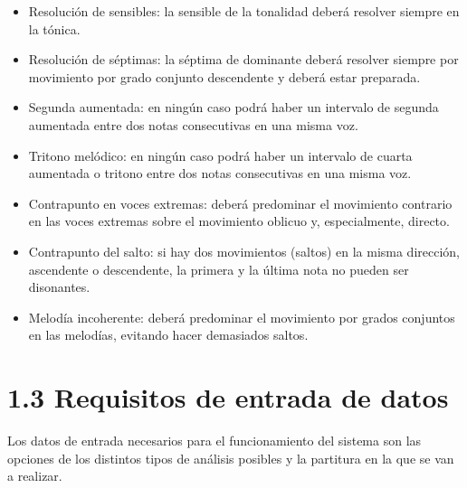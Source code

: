 \begin{itemize}

	\item Resolución de sensibles: la sensible de la tonalidad deberá resolver siempre en la tónica.

	\item Resolución de séptimas: la séptima de dominante deberá resolver siempre por movimiento por grado conjunto descendente y deberá estar preparada.

	\item Segunda aumentada: en ningún caso podrá haber un intervalo de segunda aumentada entre dos notas consecutivas en una misma voz.

	\item Tritono melódico: en ningún caso podrá haber un intervalo de cuarta aumentada o tritono entre dos notas consecutivas en una misma voz.

	\item Contrapunto en voces extremas: deberá predominar el movimiento contrario en las voces extremas sobre el movimiento oblicuo y, especialmente, directo.

	\item Contrapunto del salto: si hay dos movimientos (saltos) en la misma dirección, ascendente o descendente, la primera y la última nota no pueden ser disonantes.

	\item Melodía incoherente: deberá predominar el movimiento por grados conjuntos en las melodías, evitando hacer demasiados saltos.

\end{itemize}


\section*{1.3 Requisitos de entrada de datos}


Los datos de entrada necesarios para el funcionamiento del sistema son las opciones de los distintos tipos de análisis posibles y la partitura en la que se van a realizar. 